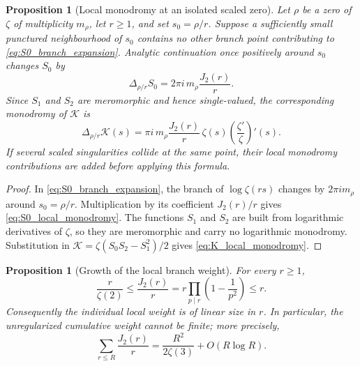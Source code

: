 \documentclass[11pt]{amsart}
\numberwithin{equation}{section}
\theoremstyle{plain}
\newtheorem{proposition}[theorem]{Proposition}
\theoremstyle{definition}
\theoremstyle{remark}
\begin{document}
\begin{proposition}[Local monodromy at an isolated scaled zero]
\label{prop:local_monodromy}
Let \(\rho\) be a zero of \(\zeta\) of multiplicity \(m_\rho\), let
\(r\ge1\), and set \(s_0=\rho/r\).  Suppose a sufficiently small punctured
neighbourhood of \(s_0\) contains no other branch point contributing to
\eqref{eq:S0_branch_expansion}.  Analytic continuation once positively around
\(s_0\) changes \(S_0\) by
\begin{equation}
\boxed{
\Delta_{\rho/r} S_0
=2\pi i\,m_\rho\frac{J_2(r)}{r}.}
\label{eq:S0_local_monodromy}
\end{equation}
Since \(S_1\) and \(S_2\) are meromorphic and hence single-valued, the
corresponding monodromy of \(\mathcal K\) is
\begin{equation}
\boxed{
\Delta_{\rho/r}\mathcal K(s)
=\pi i\,m_\rho\frac{J_2(r)}{r}\,
\zeta(s)\left(\frac{\zeta'}{\zeta}\right)'(s).}
\label{eq:K_local_monodromy}
\end{equation}
If several scaled singularities collide at the same point, their local
monodromy contributions are added before applying this formula.
\end{proposition}

\begin{proof}
In \eqref{eq:S0_branch_expansion}, the branch of
\(\log\zeta(rs)\) changes by \(2\pi i m_\rho\) around
\(s_0=\rho/r\).  Multiplication by its coefficient \(J_2(r)/r\) gives
\eqref{eq:S0_local_monodromy}.  The functions \(S_1\) and \(S_2\) are
built from logarithmic derivatives of \(\zeta\), so they are meromorphic and
carry no logarithmic monodromy.  Substitution in
\(\mathcal K=\zeta(S_0S_2-S_1^2)/2\) gives
\eqref{eq:K_local_monodromy}.
\end{proof}

\begin{proposition}[Growth of the local branch weight]
\label{prop:J2_weight_growth}
For every \(r\ge1\),
\begin{equation}
\frac{r}{\zeta(2)}\le \frac{J_2(r)}{r}
=r\prod_{p\mid r}\left(1-\frac1{p^2}\right)\le r.
\label{eq:J2_weight_bounds}
\end{equation}
Consequently the individual local weight is of linear size in \(r\).  In
particular, the unregularized cumulative weight cannot be finite; more
precisely,
\begin{equation}
\sum_{r\le R}\frac{J_2(r)}r
=\frac{R^2}{2\zeta(3)}+O(R\log R).
\label{eq:J2_weight_average}
\end{equation}
\end{proposition}
\end{document}
